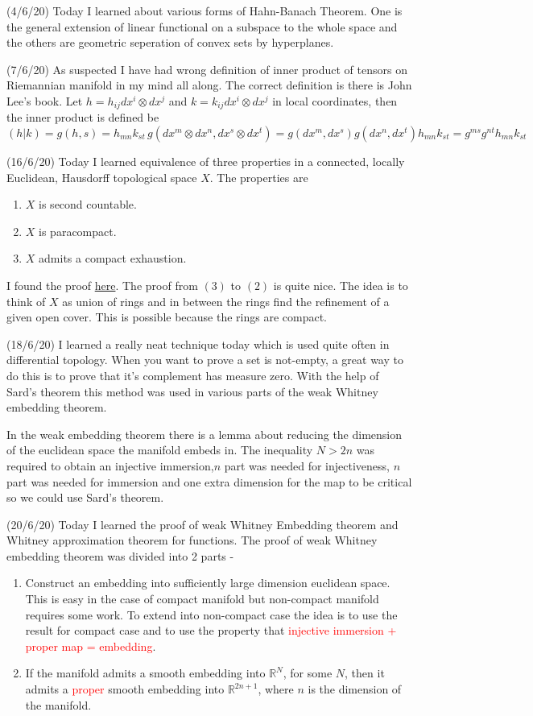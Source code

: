 \documentclass[12pt,a4paper]{article}
\begin{document}
\quad (4/6/20) Today I learned about various forms of Hahn-Banach Theorem. One is the general extension of linear functional on a subspace to the whole space and the others are geometric seperation of convex sets by hyperplanes.

(7/6/20) As suspected I have had wrong definition of inner product of tensors on Riemannian manifold in my mind all along. The correct definition is there is John Lee's book. Let $h = h_{ij}dx^i \otimes dx^j$ and $k = k_{ij}dx^i \otimes dx^j$ in local coordinates, then the inner product is defined be 
\[ (h|k) = g(h,s) = h_{mn}k_{st} \, g(dx^m \otimes dx^n, dx^s \otimes dx^t) = g(dx^m,dx^s) g(dx^n,dx^t) h_{mn}k_{st}  = g^{ms}g^{nt} h_{mn}k_{st} \]

(16/6/20) Today I learned equivalence of three properties in a connected, locally Euclidean, Hausdorff topological space $X$. The properties are 
\begin{enumerate}
\item $X$ is second countable.
\item $X$ is paracompact.
\item $X$ admits a compact exhaustion.
\end{enumerate}
 I found the proof \href{http://people.math.harvard.edu/~hirolee/pdfs/2014-fall-230a-lecture-02-addendum.pdf}{here}. The proof from $(3)$ to $(2)$ is quite nice. The idea is to think of $X$ as union of rings and in between the rings find the refinement of a given open cover. This is possible because the rings are compact.
 
(18/6/20) I learned a really neat technique today which is used quite often in differential topology. When you want to prove a set is not-empty, a great way to do this is to prove that it's complement has measure zero. With the help of Sard's theorem this method was used in various parts of the weak Whitney embedding theorem.

In the weak embedding theorem there is a lemma about reducing the dimension of the euclidean space the manifold embeds in. The inequality $N > 2n$ was required to obtain an injective immersion,$n$ part was needed for injectiveness, $n$ part was needed for immersion and one extra dimension for the map to be critical so we could use Sard's theorem.

(20/6/20) Today I learned the proof of weak Whitney Embedding theorem and Whitney approximation theorem for functions. The proof of weak Whitney embedding theorem was divided into 2 parts -
\begin{enumerate}
\item Construct an embedding into sufficiently large dimension euclidean space. This is easy in the case of compact manifold but non-compact manifold requires some work. To extend into non-compact case the idea is to use the result for compact case and to use the property that \textcolor{red}{injective immersion + proper map = embedding}.
\item If the manifold admits a smooth embedding into $\mathbb{R}^N$, for some $N$, then it admits a \textcolor{red}{proper} smooth embedding into $\mathbb{R}^{2n+1}$, where $n$ is the dimension of the manifold.
\end{enumerate}
\end{document}
